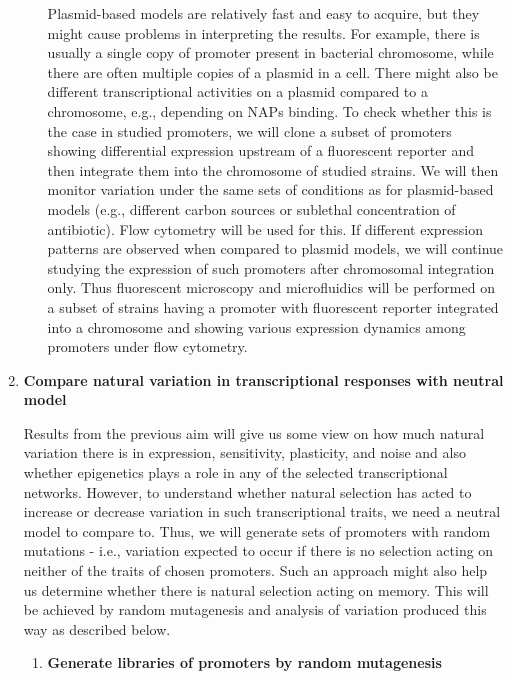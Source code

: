 \begin{enumerate}[font=\bfseries]
\begin{enumerate}[font=\bfseries]
        Plasmid-based models are relatively fast and easy to acquire, but they might cause problems in interpreting the results.
         For example, there is usually a single copy of promoter present in bacterial chromosome, while there are often multiple copies of a plasmid in a cell.
        There might also be different transcriptional activities on a plasmid compared to a chromosome, e.g., depending on NAPs binding.
        To check whether this is the case in studied promoters, we will clone a subset of promoters showing differential expression upstream of a fluorescent reporter and then integrate them into the chromosome of studied strains.
        We will then monitor variation under the same sets of conditions as for plasmid-based models (e.g., different carbon sources or sublethal concentration of antibiotic).
        Flow cytometry will be used for this.
        If different expression patterns are observed when compared to plasmid models, we will continue studying the expression of such promoters after chromosomal integration only.
        Thus fluorescent microscopy and microfluidics will be performed on a subset of strains having a promoter with fluorescent reporter integrated into a chromosome and showing various expression dynamics among promoters under flow cytometry.

    \end{enumerate}
    
    \item \textbf{Compare natural variation in transcriptional responses with neutral model}
    
    Results from the previous aim will give us some view on how much natural variation there is in expression, sensitivity, plasticity, and noise and also whether epigenetics plays a role in any of the selected transcriptional networks.
    However, to understand whether natural selection has acted to increase or decrease variation in such transcriptional traits, we need a neutral model to compare to.
    Thus, we will generate sets of promoters with random mutations - i.e., variation expected to occur if there is no selection acting on neither of the traits of chosen promoters.
    Such an approach might also help us determine whether there is natural selection acting on memory.
    This will be achieved by random mutagenesis and analysis of variation produced this way as described below.

    \begin{enumerate}[font=\bfseries]
    
        \item \textbf{Generate libraries of promoters by random mutagenesis}
        

\end{enumerate}
\end{enumerate}
